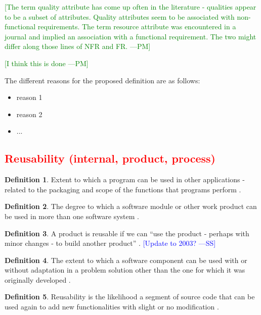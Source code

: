 \documentclass[letterpaper, cleveref]{lipics-v2019}
\newcommand{\authornote}[3]{\textcolor{#1}{[#3 ---#2]}}
\newcommand{\authornote}[3]{}
\newcommand{\wss}[1]{\authornote{blue}{SS}{#1}} %
\newcommand{\pmi}[1]{\authornote{green}{PM}{#1}} %
\newcommand{\notdone}[1]{\textcolor{red}{#1}}
\theoremstyle{definition}
\newtheorem{defn}{Definition}
\begin{document}
\pmi{The term quality attribute has come up often in the literature -
qualities appear to be a subset of attributes. Quality attributes seem to be
associated with non-functional requirements. The term resource attribute was
encountered in a journal and implied an association with a functional
requirement. The two might differ along those lines of NFR and FR.}

\pmi{I think this is done}

The different reasons for the proposed definition are as follows:

\begin{itemize}
  \item reason 1
  \item reason 2
  \item ...
\end{itemize}


\subsection{\notdone{Reusability (internal, product, process)}} %

\begin{defn}
  Extent to which a program can be used in other applications - related to
  the packaging and scope of the functions that programs perform
  \citep{McCallEtAl1977}.
\end{defn}

\begin{defn}
  The degree to which a software module or other work product can be used in
  more than one software system \citep{IEEEStdGlossarySET1990}.
\end{defn}

\begin{defn}
  A product is reusable if we can ``use the product - perhaps with minor changes
  - to build another product'' \citep{ghezzi1991fundamentals}.  \wss{Update
  to 2003?}
\end{defn}

\begin{defn} \label{ReusabilityDefnSelected}
  The extent to which a software component can be used with or without
  adaptation in a problem solution other than the one for which it was
  originally developed \citep{kalagiakos2003non}.
\end{defn}

\begin{defn}
  Reusability is the likelihood a segment of source code that can be used
  again to add new functionalities with slight or no modification
  \citep{sandhu2010survey}.
\end{defn}
\end{document}
